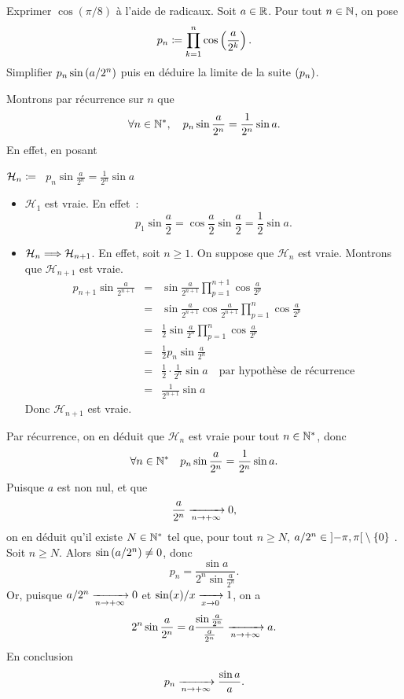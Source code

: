 \documentclass{magnoliaold}
\begin{document}
\begin{exos}
\exo Exprimer $\cos(\pi/8)$ à l'aide de radicaux.
\exo Soit $a\in\mathbb{R}$. Pour tout $n\in\mathbb{N}$, on pose
  \[p_n\coloneqq\prod_{k=1}^n \cos\left(\frac{a}{2^k}\right).\]
  Simplifier $p_n \sin\left(a/2^n\right)$ puis en déduire la limite de la suite $\left(p_n\right)$.
  \begin{sol}
Montrons par récurrence sur $n$ que
  \[\forall n\in{\mathbb{N}^*} ,\quad p_n\sin\frac{a}{2^n}=\frac{1}{2^n}\sin a.\]
  En effet, en posant
  \begin{center}
  $\mathcal{H}_n \coloneqq$ \flqq\ $p_n\sin\frac{a}{2^n}=\frac{1}{2^n}\sin a$ \frqq
  \end{center}
  \begin{itemize}
  \item $\mathcal{H}_1$ est vraie. En effet~:
    \[p_1\sin\frac{a}{2}=\cos\frac{a}{2}\sin\frac{a}{2}=\frac{1}{2}\sin a.\]
  \item $\mathcal{H}_n \Longrightarrow \mathcal{H}_{n+1}$. En effet, soit $n\geq 1$.
    On suppose que $\mathcal{H}_n$ est vraie. Montrons que $\mathcal{H}_{n+1}$
    est vraie.
    \begin{eqnarray*}
    p_{n+1}\sin\frac{a}{2^{n+1}}
    &=& \sin\frac{a}{2^{n+1}} \prod_{p=1}^{n+1} \cos\frac{a}{2^p}\\
    &=& \sin\frac{a}{2^{n+1}} \cos\frac{a}{2^{n+1}}
        \prod_{p=1}^n \cos\frac{a}{2^p}\\
    &=& \frac{1}{2} \sin\frac{a}{2^n} \prod_{p=1}^n \cos\frac{a}{2^p}\\
    &=& \frac{1}{2} p_n \sin\frac{a}{2^n}\\
    &=& \frac{1}{2}\cdot \frac{1}{2^n} \sin a
        \quad\text{par hypothèse de récurrence}\\
    &=& \frac{1}{2^{n+1}} \sin a
    \end{eqnarray*}
    Donc $\mathcal{H}_{n+1}$ est vraie.
  \end{itemize}
  Par récurrence, on en déduit que $\mathcal{H}_{n}$ est vraie pour tout
  $n\in{\mathbb{N}^*}$, donc
  \[\forall n\in{\mathbb{N}^*} \quad p_n\sin\frac{a}{2^n}=\frac{1}{2^n}\sin a.\]
  Puisque $a$ est non nul, et que
  \[\frac{a}{2^n}\xrightarrow[n\rightarrow +\infty]{}0,\]
  on en déduit qu'il existe $N\in{\mathbb{N}^*}$ tel que, pour tout $n\geq N$, $a/2^n\in\left]-\pi,\pi\right[\setminus\left\{0\right\}$ . Soit $n\geq N$. Alors $\sin\left(a/2^n\right)\neq 0$, donc
  \[p_n=\frac{\sin a}{2^n\sin\frac{a}{2^n}}.\]
  Or, puisque $a/2^n \xrightarrow[n\rightarrow +\infty]{} 0$ et $\sin(x)/x \xrightarrow[x\rightarrow 0]{} 1$,
  on a
  \[2^n\sin\frac{a}{2^n}=a\frac{\sin\frac{a}{2^n}}{\frac{a}{2^n}}
    \xrightarrow[n\rightarrow +\infty]{} a.\]
  En conclusion
  \[p_n\xrightarrow[n\rightarrow +\infty]{} \frac{\sin a}{a}.\]
  \end{sol}
\end{exos}
\end{document}
